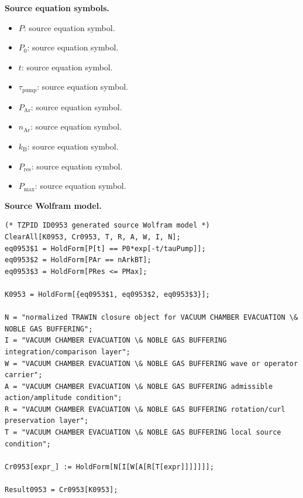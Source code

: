 \begin{minipage}[t]{0.49\linewidth}
\begingroup
\small
\raggedright
\textbf{Source equation symbols.}\par
\begin{itemize}[leftmargin=1.35em,itemsep=1pt,topsep=1pt,parsep=0pt]
    \item $P$: source equation symbol.
    \item $P_0$: source equation symbol.
    \item $t$: source equation symbol.
    \item $\tau_{\mathrm{pump}}$: source equation symbol.
    \item $P_{\mathrm{Ar}}$: source equation symbol.
    \item $n_{\mathrm{Ar}}$: source equation symbol.
    \item $k_{\mathrm{B}}$: source equation symbol.
    \item $P_{\mathrm{res}}$: source equation symbol.
    \item $P_{\mathrm{max}}$: source equation symbol.
\end{itemize}
\endgroup
\end{minipage}\hfill
\begin{minipage}[t]{0.47\linewidth}
\begingroup
\scriptsize
\raggedright
\textbf{Source Wolfram model.}\par
\begin{Verbatim}[fontsize=\tiny,breaklines=true,breakanywhere=true]
(* TZPID ID0953 generated source Wolfram model *)
ClearAll[K0953, Cr0953, T, R, A, W, I, N];
eq0953$1 = HoldForm[P[t] == P0*exp[-t/tauPump]];
eq0953$2 = HoldForm[PAr == nArkBT];
eq0953$3 = HoldForm[PRes <= PMax];

K0953 = HoldForm[{eq0953$1, eq0953$2, eq0953$3}];

N = "normalized TRAWIN closure object for VACUUM CHAMBER EVACUATION \& NOBLE GAS BUFFERING";
I = "VACUUM CHAMBER EVACUATION \& NOBLE GAS BUFFERING integration/comparison layer";
W = "VACUUM CHAMBER EVACUATION \& NOBLE GAS BUFFERING wave or operator carrier";
A = "VACUUM CHAMBER EVACUATION \& NOBLE GAS BUFFERING admissible action/amplitude condition";
R = "VACUUM CHAMBER EVACUATION \& NOBLE GAS BUFFERING rotation/curl preservation layer";
T = "VACUUM CHAMBER EVACUATION \& NOBLE GAS BUFFERING local source condition";

Cr0953[expr_] := HoldForm[N[I[W[A[R[T[expr]]]]]]];

Result0953 = Cr0953[K0953];
\end{Verbatim}
\endgroup
\end{minipage}

